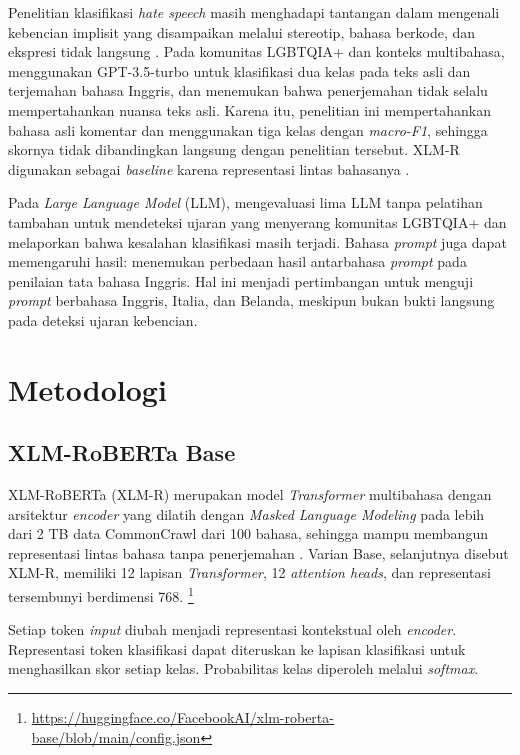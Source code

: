 \documentclass[11pt]{article}
\begin{document}
Penelitian klasifikasi \textit{hate speech} masih menghadapi tantangan dalam mengenali kebencian implisit yang disampaikan melalui stereotip, bahasa berkode, dan ekspresi tidak langsung \citep{elsherief-etal-2021-latent}. Pada komunitas LGBTQIA+ dan konteks multibahasa, \citet{chan-etal-2024-hate} menggunakan GPT-3.5-turbo untuk klasifikasi dua kelas pada teks asli dan terjemahan bahasa Inggris, dan menemukan bahwa penerjemahan tidak selalu mempertahankan nuansa teks asli. Karena itu, penelitian ini mempertahankan bahasa asli komentar dan menggunakan tiga kelas dengan \textit{macro-F1}, sehingga skornya tidak dibandingkan langsung dengan penelitian tersebut. XLM-R digunakan sebagai \textit{baseline} karena representasi lintas bahasanya \citep{conneau-etal-2020-unsupervised}.

Pada \textit{Large Language Model} (LLM), \citet{nguyen-etal-2025-leveraging} mengevaluasi lima LLM tanpa pelatihan tambahan untuk mendeteksi ujaran yang menyerang komunitas LGBTQIA+ dan melaporkan bahwa kesalahan klasifikasi masih terjadi. Bahasa \textit{prompt} juga dapat memengaruhi hasil: \citet{behzad-etal-2024-ask} menemukan perbedaan hasil antarbahasa \textit{prompt} pada penilaian tata bahasa Inggris. Hal ini menjadi pertimbangan untuk menguji \textit{prompt} berbahasa Inggris, Italia, dan Belanda, meskipun bukan bukti langsung pada deteksi ujaran kebencian.

\section{Metodologi}
\subsection{XLM-RoBERTa Base}
XLM-RoBERTa (XLM-R) merupakan model \textit{Transformer} multibahasa dengan arsitektur \textit{encoder} yang dilatih dengan \textit{Masked Language Modeling} pada lebih dari 2 TB data CommonCrawl dari 100 bahasa, sehingga mampu membangun representasi lintas bahasa tanpa penerjemahan \citep{conneau-etal-2020-unsupervised}. Varian Base, selanjutnya disebut XLM-R, memiliki 12 lapisan \textit{Transformer}, 12 \textit{attention heads}, dan representasi tersembunyi berdimensi 768.
\footnote{\url{https://huggingface.co/FacebookAI/xlm-roberta-base/blob/main/config.json}}

Setiap token \textit{input} diubah menjadi representasi kontekstual oleh \textit{encoder}. Representasi token klasifikasi dapat diteruskan ke lapisan klasifikasi untuk menghasilkan skor setiap kelas. Probabilitas kelas diperoleh melalui \textit{softmax}.
\end{document}
